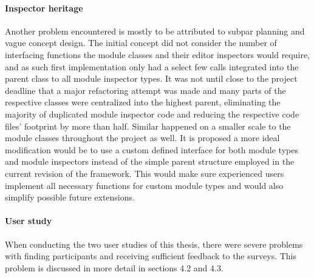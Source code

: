 \paragraph{Inspector heritage} Another problem encountered is mostly to be attributed to subpar planning and vague concept design. The initial concept did not consider the number of interfacing functions the module classes and their editor inspectors would require, and as such first implementation only had a select few calls integrated into the parent class to all module inspector types. It was not until close to the project deadline that a major refactoring attempt was made and many parts of the respective classes were centralized into the highest parent, eliminating the majority of duplicated module inspector code and reducing the respective code files' footprint by more than half. Similar happened on a smaller scale to the module classes throughout the project as well. It is proposed a more ideal modification would be to use a custom defined interface for both module types and module inspectors instead of the simple parent structure employed in the current revision of the framework. This would make sure experienced users implement all necessary functions for custom module types and would also simplify possible future extensions. 
\paragraph{User study} When conducting the two user studies of this thesis, there were severe problems with finding participants and receiving sufficient feedback to the surveys. This problem is discussed in more detail in sections 4.2 and 4.3. 
